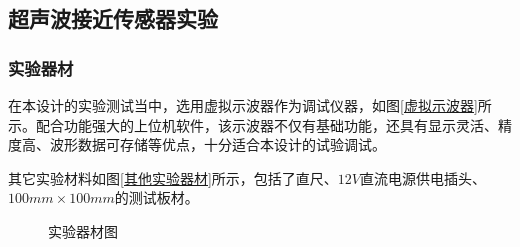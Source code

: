 \subsection{超声波接近传感器实验}
\subsubsection{实验器材}
在本设计的实验测试当中，选用虚拟示波器作为调试仪器，如图\ref{虚拟示波器}所示。配合功能强大的上位机软件，该示波器不仅有基础功能，还具有显示灵活、精度高、波形数据可存储等优点，十分适合本设计的试验调试。\par
其它实验材料如图\ref{其他实验器材}所示，包括了直尺、$12V$直流电源供电插头、$100mm\times100mm$的测试板材。

\begin{figure}[ht]
	\centering
	\caption{实验器材图}
	\label{实验器材图}
\end{figure}
